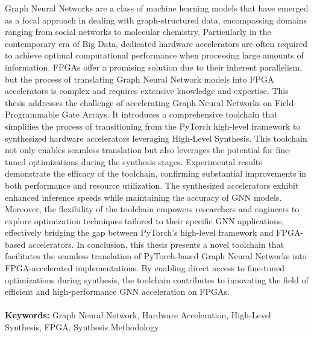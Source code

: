 Graph Neural Networks are a class of machine learning models that have emerged as a focal approach in dealing with graph-structured data, encompassing domains ranging from social networks to molecular chemistry.
Particularly in the contemporary era of Big Data, dedicated hardware accelerators are often required to achieve optimal computational performance when processing large amounts of information.
FPGAs offer a promising solution due to their inherent parallelism, but the process of translating Graph Neural Network models into FPGA accelerators is complex and requires extensive knowledge and expertise.
This thesis addresses the challenge of accelerating Graph Neural Networks on Field-Programmable Gate Arrays.
It introduces a comprehensive toolchain that simplifies the process of transitioning from the PyTorch high-level framework to synthesized hardware accelerators leveraging High-Level Synthesis.
This toolchain not only enables seamless translation but also leverages the potential for fine-tuned optimizations during the synthesis stages.
Experimental results demonstrate the efficacy of the toolchain, confirming substantial improvements in both performance and resource utilization.
The synthesized accelerators exhibit enhanced inference speeds while maintaining the accuracy of GNN models.
Moreover, the flexibility of the toolchain empowers researchers and engineers to explore optimization techniques tailored to their specific GNN applications, effectively bridging the gap between PyTorch's high-level framework and FPGA-based accelerators.
In conclusion, this thesis presents a novel toolchain that facilitates the seamless translation of PyTorch-based Graph Neural Networks into FPGA-accelerated implementations.
By enabling direct access to fine-tuned optimizations during synthesis, the toolchain contributes to innovating the field of efficient and high-performance GNN acceleration on FPGAs.
\\
\\
\textbf{Keywords:} Graph Neural Network, Hardware Acceleration, High-Level Synthesis, FPGA, Synthesis Methodology %